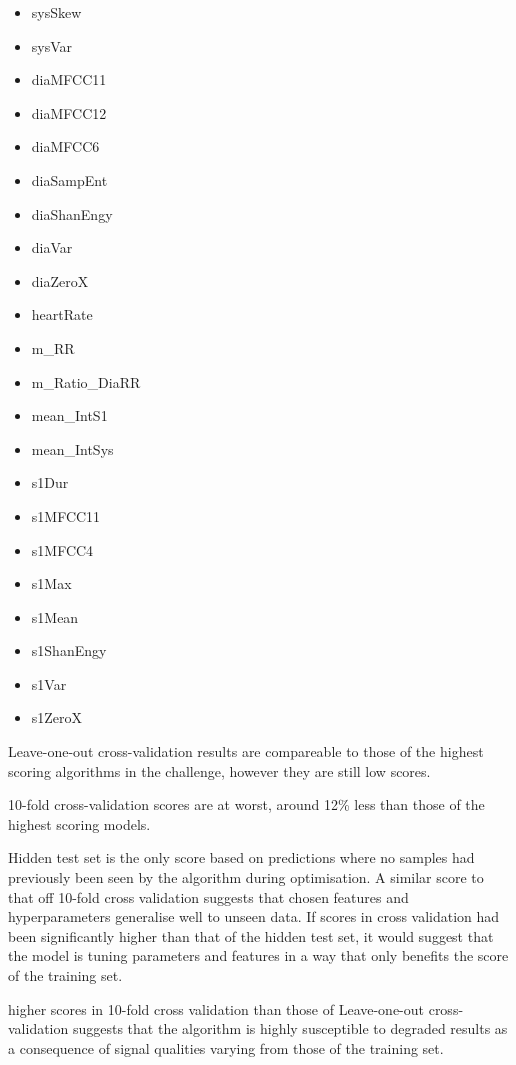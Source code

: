 \documentclass[titlepage, 12pt]{scrartcl} \usepackage{enumitem}
\begin{document}
\begin{table}[H]
\begin{multicols}{5}
\begin{itemize}
    \item sysSkew
    \item sysVar
    \item diaMFCC11
    \item diaMFCC12
    \item diaMFCC6
    \item diaSampEnt
    \item diaShanEngy
    \item diaVar
    \item diaZeroX
    \item heartRate
    \item m\_RR
    \item m\_Ratio\_DiaRR
    \item mean\_IntS1
    \item mean\_IntSys
    \item s1Dur
    \item s1MFCC11
    \item s1MFCC4
    \item s1Max
    \item s1Mean
    \item s1ShanEngy
    \item s1Var
    \item s1ZeroX
\end{itemize}
\end{multicols}
\end{table}



Leave-one-out cross-validation results are compareable to those of the highest
scoring algorithms in the challenge, however they are still low scores.~\parencite{Homsi2017, Bobillo2016}

10-fold cross-validation scores are at worst, around 12\% less than those of
the highest scoring models.~\parencite{Zabihi2016}

Hidden test set is the only score based on predictions where no samples had
previously been seen by the algorithm during optimisation. A similar score to
that off 10-fold cross validation suggests that chosen features and
hyperparameters generalise well to unseen data. If scores in cross validation
had been significantly higher than that of the hidden test set, it would
suggest that the model is tuning parameters and features in a way that only
benefits the score of the training set.

higher scores in 10-fold cross validation than those of Leave-one-out
cross-validation suggests that the algorithm is highly susceptible to degraded
results as a consequence of signal qualities varying from those of the training
set.
\end{document}

